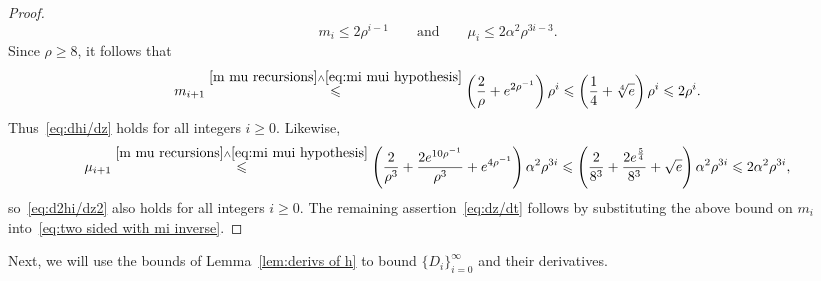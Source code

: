 \documentclass[11pt,reqno]{amsart}
\newcommand{\0}{\mathbf{0}}
\renewcommand{\1}{\mathbf 1}
\renewcommand{\ge}{\geqslant}
\renewcommand{\le}{\leqslant}
\theoremstyle{remark}
\begin{document}
\begin{proof}
 \begin{equation}\label{eq:mi mui hypothesis}
 m_i\le 2 \rho^{i-1}\qquad \mathrm{and}\qquad  \mu_i\le 2\alpha^2\rho^{3i-3}.
   \end{equation}
   Since $\rho\ge 8$, it follows that
   $$
   m_{i+1}\stackrel{\eqref{m mu recursions}\wedge\eqref{eq:mi mui hypothesis}}{\le} \left(\frac{2}{\rho}+e^{2\rho^{-1}}\right)\rho^i\le \left(\frac14+\sqrt[4]{e}\right)\rho^i\le 2\rho^i.
   $$
 Thus~\eqref{eq:dhi/dz} holds for all integers $i\ge 0$.  Likewise,
 $$
\mu_{i+1}  \stackrel{\eqref{m mu recursions}\wedge\eqref{eq:mi mui hypothesis}}{\le} \left(\frac{2}{\rho^3}+\frac{2e^{10\rho^{-1}}}{\rho^3}+e^{4\rho^{-1}}\right)\alpha^2\rho^{3i}\le \left(\frac{2}{8^3}+\frac{2e^{\frac54}}{8^3}+\sqrt{e}\right)\alpha^2\rho^{3i}\le 2\alpha^2\rho^{3i},
 $$
 so~\eqref{eq:d2hi/dz2} also holds for all integers $i\ge 0$. The remaining assertion~\eqref{eq:dz/dt} follows by substituting the above bound on $m_i$ into~\eqref{eq:two sided with mi inverse}. \qedhere
 \end{proof}

Next, we will use the bounds of Lemma~\ref{lem:derivs of h} to bound  $\{D_i\}_{i=0}^\infty$ and their derivatives.
\end{document}
